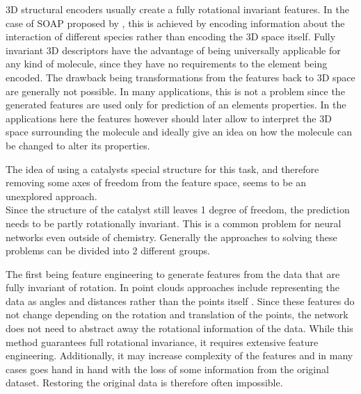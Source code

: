 3D structural encoders usually create a fully rotational invariant features.
In the case of SOAP proposed by \citeauthor{Bart_k_2013}, this is achieved by encoding information about the interaction of 
different species rather than encoding the 3D space itself.
Fully invariant 3D descriptors have the advantage of being universally applicable for any kind of molecule, since they have no requirements to the element being encoded.
The drawback being transformations from the features back to 3D space are generally not possible.
In many applications, this is not a problem since the generated features are used only for prediction of an elements properties.
In the applications here the features however should later allow to interpret the 3D space surrounding the molecule and ideally give an idea on how the molecule can be changed to alter its properties.

The idea of using a catalysts special structure for this task, and therefore removing some axes of freedom from the feature space, seems to be an unexplored approach.
\\

Since the structure of the catalyst still leaves 1 degree of freedom, the prediction needs to be partly rotationally invariant.
This is a common problem for neural networks even outside of chemistry.
Generally the approaches to solving these problems can be divided into 2 different groups.

The first being feature engineering to generate features from the data that are fully invariant of rotation.
In point clouds approaches include representing the data as angles and distances rather than the points itself \cite{weiler20183d, 8886052}.
Since these features do not change depending on the rotation and translation of the points, the network does not need to 
abstract away the rotational information of the data.
While this method guarantees full rotational invariance, it requires extensive feature engineering.
Additionally, it may increase complexity of the features and in many cases 
goes hand in hand with the loss of some information from the original dataset. 
Restoring the original data is therefore often impossible.


